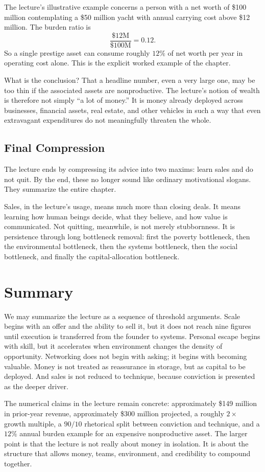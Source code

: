 The lecture's illustrative example concerns a person with a net worth of \$100 million contemplating a \$50 million yacht with annual carrying cost above \$12 million. The burden ratio is
\begin{equation}
\frac{\$12\text{M}}{\$100\text{M}}=0.12.
\end{equation}
So a single prestige asset can consume roughly \(12\%\) of net worth per year in operating cost alone. This is the explicit worked example of the chapter.

What is the conclusion? That a headline number, even a very large one, may be too thin if the associated assets are nonproductive. The lecture's notion of wealth is therefore not simply ``a lot of money.'' It is money already deployed across businesses, financial assets, real estate, and other vehicles in such a way that even extravagant expenditures do not meaningfully threaten the whole.

\subsection{Final Compression}

The lecture ends by compressing its advice into two maxims: learn sales and do not quit. By the end, these no longer sound like ordinary motivational slogans. They summarize the entire chapter.

Sales, in the lecture's usage, means much more than closing deals. It means learning how human beings decide, what they believe, and how value is communicated. Not quitting, meanwhile, is not merely stubbornness. It is persistence through long bottleneck removal: first the poverty bottleneck, then the environmental bottleneck, then the systems bottleneck, then the social bottleneck, and finally the capital-allocation bottleneck.

\section{Summary}

We may summarize the lecture as a sequence of threshold arguments. Scale begins with an offer and the ability to sell it, but it does not reach nine figures until execution is transferred from the founder to systems. Personal escape begins with skill, but it accelerates when environment changes the density of opportunity. Networking does not begin with asking; it begins with becoming valuable. Money is not treated as reassurance in storage, but as capital to be deployed. And sales is not reduced to technique, because conviction is presented as the deeper driver.

The numerical claims in the lecture remain concrete: approximately \$149 million in prior-year revenue, approximately \$300 million projected, a roughly \(2\times\) growth multiple, a \(90/10\) rhetorical split between conviction and technique, and a \(12\%\) annual burden example for an expensive nonproductive asset. The larger point is that the lecture is not really about money in isolation. It is about the structure that allows money, teams, environment, and credibility to compound together.